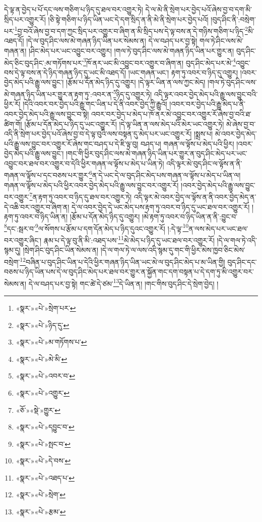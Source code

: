 དེ་ལྟ་ན་བྱེད་པ་པོ་དང་ལས་གཅིག་པ་ཉིད་དུ་ཐལ་བར་འགྱུར་ཏེ། དེ་ལ་མེ་ནི་སྲེག་པར་བྱེད་པའོ་ཞེས་བྱ་བ་དག་མི་སྲིད་པར་འགྱུར་རོ། །ཅི་སྟེ་གཅིག་པ་ཉིད་ཡིན་ཡང་དེ་དག་སྲིད་ན་ནི་མེ་ནི་སྲེག་པར་བྱེད་པའོ། །བུད་ཤིང་ནི་:བསྲེག་པར་\footnote{«སྣར་»«པེ་»སྲེག་པར་}བྱ་བའོ་ཞེས་བྱ་བ་དག་ཀྱང་སྲིད་པར་འགྱུར་བ་ཞིག་ན་མི་སྲིད་པས་དེ་ལྟ་བས་ན་དེ་གཉིས་གཅིག་པ་ཉིད་\footnote{«སྣར་»«པེ་»ཉིད་དུ་}མི་འཐད་དོ། །དེ་ལ་བུད་ཤིང་ལས་མེ་གཞན་ཉིད་ཡིན་པར་སེམས་ན། དེ་ལ་བཤད་པར་བྱ་སྟེ། གལ་ཏེ་ཤིང་ལས་མེ་གཞན་ན། །ཤིང་མེད་པར་ཡང་འབྱུང་བར་འགྱུར། །གལ་ཏེ་བུད་ཤིང་ལས་མེ་གཞན་ཉིད་ཡིན་པར་གྱུར་ན། བུད་ཤིང་མེད་ཅིང་བུད་ཤིང་:མ་གཏོགས་པར་\footnote{«སྣར་»«པེ་»མ་གཏོགས་པ་}ཁོ་ནར་ཡང་མི་འབྱུང་བར་འགྱུར་བ་ཞིག་ན། བུད་ཤིང་མེད་པར་མེ་\footnote{«སྣར་»«པེ་»མེ་མི་}འབྱུང་བས་དེ་ལྟ་བས་ན་དེ་ཉིད་གཞན་ཉིད་དུ་ཡང་མི་འཐད་དོ། །ཡང་གཞན་ཡང་། རྟག་ཏུ་འབར་བ་ཉིད་དུ་འགྱུར། །འབར་བྱེད་མེད་པའི་རྒྱུ་ལས་བྱུང་། །རྩོམ་པ་དོན་མེད་ཉིད་དུ་འགྱུར། །དེ་ལྟར་ཡིན་ན་ལས་ཀྱང་མེད། །གལ་ཏེ་བུད་ཤིང་ལས་མེ་གཞན་ཉིད་ཡིན་པར་གྱུར་ན་རྟག་ཏུ་:འབར་ན་\footnote{«སྣར་»«པེ་»འབར་བ་}ཉིད་དུ་འགྱུར་ཏེ། འདི་ལྟར་འབར་བྱེད་མེད་པའི་རྒྱུ་ལས་བྱུང་བའི་ཕྱིར་རོ། །དེའི་འབར་བར་བྱེད་པའི་རྒྱུ་གང་ཡིན་པ་དེ་ནི་འབར་བྱེད་ཀྱི་རྒྱུའོ། །འབར་བར་བྱེད་པའི་རྒྱུ་མེད་པ་ནི་འབར་བྱེད་མེད་པའི་རྒྱུ་ལས་བྱུང་བ་སྟེ། འབར་བར་བྱེད་པ་མེད་པ་ཁོ་ནར་མེ་འབྱུང་བར་འགྱུར་རོ་ཞེས་བྱ་བའི་ཐ་ཚིག་གོ། །རྩོམ་པ་དོན་མེད་པ་ཉིད་དུ་ཡང་འགྱུར་རོ། །དེ་ལྟ་ཡིན་ན་ལས་མེད་པའི་མེར་ཡང་འགྱུར་ཏེ། མེ་ཞེས་བྱ་བ་འདི་ནི་སྲེག་པར་བྱེད་པའོ་ཞེས་བྱ་བ་དེ་ལྟ་བུའི་ལས་བསྟན་དུ་མེད་པར་ཡང་འགྱུར་རོ། །སྨྲས་པ། མེ་འབར་བྱེད་མེད་པའི་རྒྱུ་ལས་བྱུང་བར་འགྱུར་རོ་ཞེས་གང་བཤད་པ་དེ་ཇི་ལྟ་བུ། བཤད་པ། གཞན་ལ་ལྟོས་པ་མེད་པའི་ཕྱིར། །འབར་བྱེད་མེད་པའི་རྒྱུ་ལས་བྱུང་། །གང་གི་ཕྱིར་བུད་ཤིང་ལས་མེ་གཞན་ཉིད་ཡིན་པར་གྱུར་ན་བུད་ཤིང་མེད་པར་ཡང་འབྱུང་བར་ཐལ་བར་འགྱུར་བ་དེའི་ཕྱིར་གཞན་ལ་ལྟོས་པ་མེད་པ་ཡིན་ཏེ། འདི་ལྟར་མེ་བུད་ཤིང་ལ་ལྟོས་ན་ནི་གཞན་ལ་ལྟོས་པ་དང་བཅས་པར་གྱུར་\footnote{«སྣར་»«པེ་»འགྱུར་}ན་དེ་ཡང་དེ་ལ་བུད་ཤིང་མེད་པས་གཞན་ལ་ལྟོས་པ་མེད་པ་ཡིན་ལ། གཞན་ལ་ལྟོས་པ་མེད་པའི་ཕྱིར་འབར་བྱེད་མེད་པའི་རྒྱུ་ལས་བྱུང་བར་འགྱུར་རོ། །འབར་བྱེད་མེད་པའི་རྒྱུ་ལས་བྱུང་བར་འགྱུར་\footnote{«ཅོ་»«སྡེ་»གྱུར་}ན་རྟག་ཏུ་འབར་བ་ཉིད་དུ་ཐལ་བར་འགྱུར་ཏེ། འདི་ལྟར་མེ་འབར་བྱེད་ལ་ལྟོས་ན་ནི་འབར་བྱེད་མེད་ན་དེ་འཆི་བར་འགྱུར་བ་ཞིག་ན། དེ་ལ་འབར་བྱེད་དེ་ཡང་མེད་པས་རྟག་ཏུ་འབར་བ་ཉིད་དུ་ཡང་ཐལ་བར་འགྱུར་རོ། །རྟག་ཏུ་འབར་བ་ཉིད་ཡིན་ན། །རྩོམ་པ་དོན་མེད་ཉིད་དུ་འགྱུར། །མེ་རྟག་ཏུ་འབར་བ་ཉིད་ཡིན་ན་ནི་:བྱུང་བ་\footnote{«སྣར་»«པེ་»དབྱུང་བ་}དང་:སྦར་བ་\footnote{«སྣར་»«པེ་»སྤང་བ་}ལ་སོགས་པ་རྩོམ་པ་དག་དོན་མེད་པ་ཉིད་དུའང་འགྱུར་རོ། །:དེ་ལྟ་\footnote{«སྣར་»«པེ་»དེ་བས་}ན་ལས་མེད་པར་ཡང་ཐལ་བར་འགྱུར་ཞིང་། རྣམ་པ་དེ་ལྟ་བུ་ནི་མི་:འཐད་པས་\footnote{«སྣར་»«པེ་»འཐད་པ་}མེ་མེད་པ་ཉིད་དུ་ཡང་ཐལ་བར་འགྱུར་རོ། །དེ་ལ་གལ་ཏེ་འདི་སྙམ་དུ། །སྲེག་ཤིང་བུད་ཤིང་ཡིན་སེམས་ན། །དེ་ལ་གལ་ཏེ་ལ་ལས་འདི་སྙམ་དུ་གང་གི་ཕྱིར་མེས་ཁྱབ་ཅིང་མེས་བསྲེག་\footnote{«སྣར་»«པེ་»སྲེག་}བཞིན་པ་བུད་ཤིང་ཡིན་པ་དེའི་ཕྱིར་གཞན་ཉིད་ཡིན་ཡང་མེ་ལ་བུད་ཤིང་མེད་པ་མ་ཡིན་གྱི། བུད་ཤིང་དང་བཅས་པ་ཉིད་ཡིན་པས་དེ་ལ་བུད་ཤིང་མེད་པར་ཐལ་བར་གྱུར་ན་སྐྱོན་གང་དག་བསྟན་པ་དེ་དག་ཏུ་མི་འགྱུར་བར་སེམས་ན། དེ་ལ་བཤད་པར་བྱ་སྟེ། གང་ཚེ་དེ་ཙམ་\footnote{«སྣར་»«པེ་»རྩམ་}དེ་ཡིན་ན། །གང་གིས་བུད་ཤིང་དེ་སྲེག་བྱེད། །
